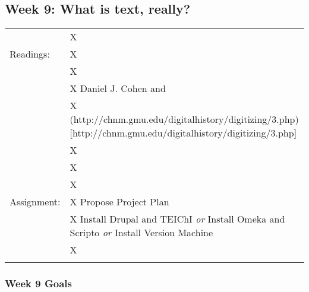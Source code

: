 \documentclass[]{article}
\begin{document}
\subsection{Week 9: What is text,
really?}\label{week-9-what-is-text-really}

\begin{longtable}[c]{@{}ll@{}}
\toprule\addlinespace
& X
\\\addlinespace
Readings: & X
\\\addlinespace
& X
\\\addlinespace
& X Daniel J. Cohen and
\\\addlinespace
& X
(http://chnm.gmu.edu/digitalhistory/digitizing/3.php){[}http://chnm.gmu.edu/digitalhistory/digitizing/3.php{]}
\\\addlinespace
& X
\\\addlinespace
& X
\\\addlinespace
& X
\\\addlinespace
Assignment: & X Propose Project Plan
\\\addlinespace
& X Install Drupal and TEIChI \emph{or} Install Omeka and Scripto
\emph{or} Install Version Machine
\\\addlinespace
& X
\\\addlinespace
\bottomrule
\end{longtable}

\subsubsection{Week 9 Goals}\label{week-9-goals}
\end{document}
